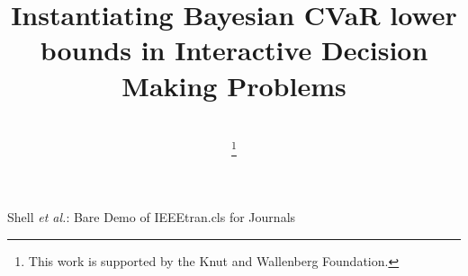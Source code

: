 \documentclass[conference]{IEEEtran}
\begin{document}
%
\title{Instantiating Bayesian CVaR lower bounds in Interactive Decision Making Problems}
%
%
%

\author{
\\
\thanks{This work is supported by the Knut and Wallenberg Foundation.}
}

% 
%



%
{Shell \MakeLowercase{\textit{et al.}}: Bare Demo of IEEEtran.cls for Journals}
% 
\end{document}
